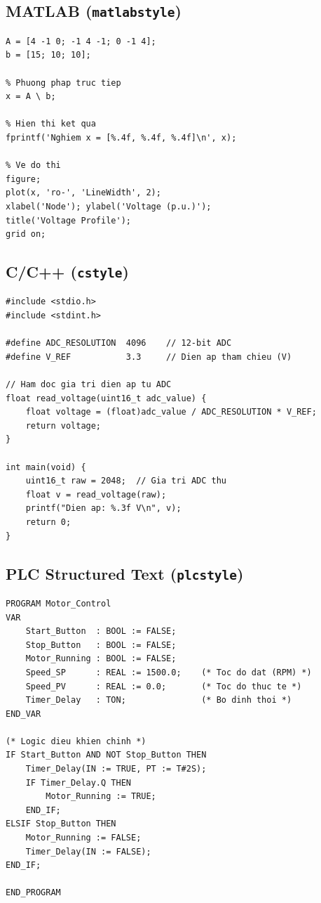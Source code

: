 \subsection{MATLAB (\texttt{matlabstyle})}

\begin{lstlisting}[style=matlabstyle, caption={Ví dụ mã MATLAB --- Giải hệ phương trình}, label={lst:matlab-sample}]
% Giai he phuong trinh tuyen tinh Ax = b
A = [4 -1 0; -1 4 -1; 0 -1 4];
b = [15; 10; 10];

% Phuong phap truc tiep
x = A \ b;

% Hien thi ket qua
fprintf('Nghiem x = [%.4f, %.4f, %.4f]\n', x);

% Ve do thi
figure;
plot(x, 'ro-', 'LineWidth', 2);
xlabel('Node'); ylabel('Voltage (p.u.)');
title('Voltage Profile');
grid on;
\end{lstlisting}

\subsection{C/C++ (\texttt{cstyle})}

\begin{lstlisting}[style=cstyle, caption={Ví dụ mã C --- Đọc ADC vi điều khiển}, label={lst:c-sample}]
#include <stdio.h>
#include <stdint.h>

#define ADC_RESOLUTION  4096    // 12-bit ADC
#define V_REF           3.3     // Dien ap tham chieu (V)

// Ham doc gia tri dien ap tu ADC
float read_voltage(uint16_t adc_value) {
    float voltage = (float)adc_value / ADC_RESOLUTION * V_REF;
    return voltage;
}

int main(void) {
    uint16_t raw = 2048;  // Gia tri ADC thu
    float v = read_voltage(raw);
    printf("Dien ap: %.3f V\n", v);
    return 0;
}
\end{lstlisting}

\subsection{PLC Structured Text (\texttt{plcstyle})}

\begin{lstlisting}[style=plcstyle, caption={Ví dụ PLC Structured Text --- Điều khiển động cơ}, label={lst:plc-sample}]
PROGRAM Motor_Control
VAR
    Start_Button  : BOOL := FALSE;
    Stop_Button   : BOOL := FALSE;
    Motor_Running : BOOL := FALSE;
    Speed_SP      : REAL := 1500.0;    (* Toc do dat (RPM) *)
    Speed_PV      : REAL := 0.0;       (* Toc do thuc te *)
    Timer_Delay   : TON;               (* Bo dinh thoi *)
END_VAR

(* Logic dieu khien chinh *)
IF Start_Button AND NOT Stop_Button THEN
    Timer_Delay(IN := TRUE, PT := T#2S);
    IF Timer_Delay.Q THEN
        Motor_Running := TRUE;
    END_IF;
ELSIF Stop_Button THEN
    Motor_Running := FALSE;
    Timer_Delay(IN := FALSE);
END_IF;

END_PROGRAM
\end{lstlisting}

